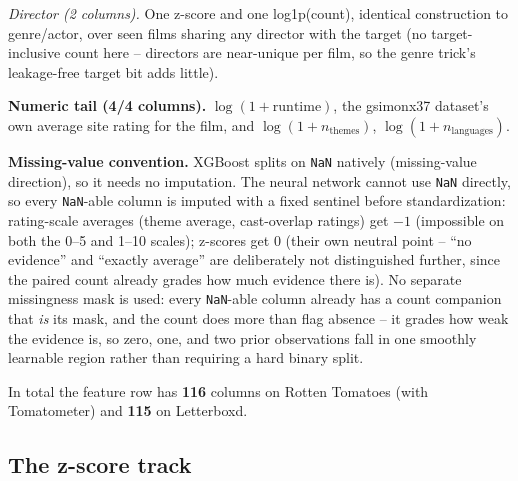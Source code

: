 \documentclass[11pt]{article}
\begin{document}
\emph{Director (2 columns).} One z-score and one log1p(count), identical construction to genre/actor, over seen films sharing any director with the target (no target-inclusive count here -- directors are near-unique per film, so the genre trick's leakage-free target bit adds little).

\textbf{Numeric tail (4/4 columns).} $\log(1+\text{runtime})$, the gsimonx37 dataset's own average site rating for the film, and $\log(1+n_{\text{themes}})$, $\log(1+n_{\text{languages}})$.

\textbf{Missing-value convention.} XGBoost splits on \texttt{NaN} natively (missing-value direction), so it needs no imputation. The neural network cannot use \texttt{NaN} directly, so every \texttt{NaN}-able column is imputed with a fixed sentinel before standardization: rating-scale averages (theme average, cast-overlap ratings) get $-1$ (impossible on both the 0--5 and 1--10 scales); z-scores get $0$ (their own neutral point -- ``no evidence'' and ``exactly average'' are deliberately not distinguished further, since the paired count already grades how much evidence there is). No separate missingness mask is used: every \texttt{NaN}-able column already has a count companion that \emph{is} its mask, and the count does more than flag absence -- it grades how weak the evidence is, so zero, one, and two prior observations fall in one smoothly learnable region rather than requiring a hard binary split.

In total the feature row has \textbf{116} columns on Rotten Tomatoes (with Tomatometer) and \textbf{115} on Letterboxd.

\subsection{The z-score track}
\label{sec:zscore-concept}
\end{document}
